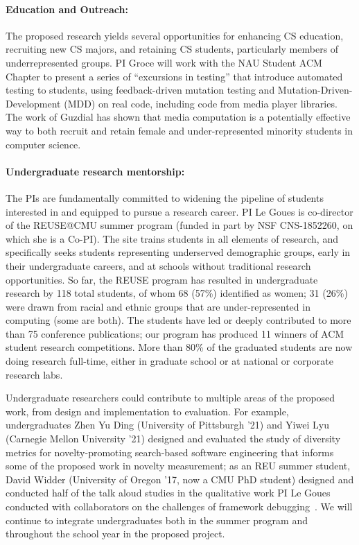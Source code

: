 \paragraph{Education and Outreach:}
The proposed research yields several opportunities for enhancing CS
education, recruiting new CS majors, and retaining CS students,
particularly members of underrepresented groups.  
PI Groce will work with the NAU Student ACM Chapter to present a
series of ``excursions in testing'' that introduce automated testing
to students, using feedback-driven mutation testing and Mutation-Driven-Development (MDD) on real code, including code from
media player libraries.  The work of Guzdial
\cite{Guzdial} has shown that media computation is a
potentially effective way to both recruit and retain female and
under-represented minority students in computer science.

\paragraph{Undergraduate research mentorship:} 
The PIs are fundamentally committed to widening the pipeline of students
interested in and equipped to pursue a research career. PI Le Goues is
co-director of the REUSE@CMU summer program (funded in part by NSF CNS-1852260,
on which she is a Co-PI). The site trains students in
all elements of research, and specifically seeks students representing
underserved demographic groups, early in their undergraduate careers, and at
schools without traditional research opportunities.  So far, the REUSE program
has resulted in undergraduate research by 118 total students, of whom 68 (57\%)
identified as women; 31 (26\%) were drawn from racial and ethnic groups that are
under-represented in computing (some are both).  The students have led or deeply contributed to more than 75 conference publications; our program has produced 11 winners of ACM student research competitions. More than 80\% of the graduated
students are now doing research full-time, either in graduate school or at
national or corporate research labs.

Undergraduate researchers could contribute to multiple areas of the proposed
work, from design and implementation to evaluation. For example, undergraduates
Zhen Yu Ding (University of Pittsburgh '21) and Yiwei Lyu (Carnegie Mellon
University '21) designed and evaluated the study of diversity metrics for
novelty-promoting search-based software engineering that informs some of the
proposed work in novelty measurement; as an REU summer student, David Widder
(University of Oregon '17, now a CMU PhD student) designed and conducted half of
the talk aloud studies in the qualitative work PI Le Goues conducted with
collaborators on the challenges of framework
debugging~\cite{frameworkDebugging}.  We will continue to integrate
undergraduates both in the summer program and throughout the school year in the
proposed project.
